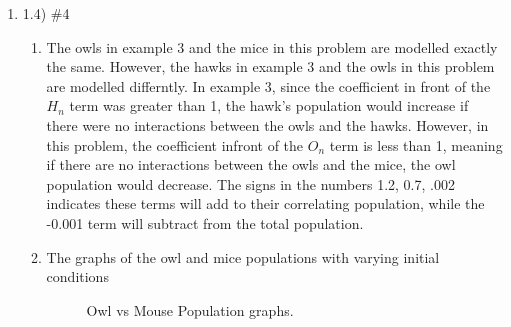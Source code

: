 \documentclass[12pt,letterpaper]{article}
\begin{document}
\begin{enumerate}
\item 1.4) \#4
\begin{enumerate}
  \item The owls in example 3 and the mice in this problem are modelled exactly the same. 
    However, the hawks in example 3 and the owls in this problem are modelled differntly. 
    In example 3, since the coefficient in front of the $H_{n}$ term was greater than 1, 
    the hawk's population would increase if there were no interactions between the owls 
    and the hawks. However, in this problem, the coefficient infront of the $O_{n}$ term
    is less than 1, meaning if there are no interactions between the owls and the mice, 
    the owl population would decrease. The signs in the numbers 1.2, 0.7, .002 indicates 
    these terms will add to their correlating population, while the -0.001 term will 
    subtract from the total population.
  \item The graphs of the owl and mice populations with varying initial conditions
    \begin{figure}[!htb]
      \caption{\label{fig:3} Owl vs Mouse Population graphs.}
    \end{figure}
    \begin{figure}[!htb]

\end{figure}
\end{enumerate}
\end{enumerate}
\end{document}
